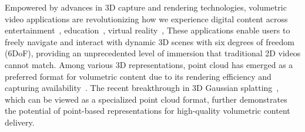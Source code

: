 

Empowered by advances in 3D capture and rendering technologies, volumetric video applications are revolutionizing how we experience digital content across entertainment~\cite{volumetricgames}, education~\cite{emad2022moesr}, virtual reality~\cite{efeve2024}, \etc These applications enable users to freely navigate and interact with dynamic 3D scenes with six degrees of freedom (6DoF), providing an unprecedented level of immersion that traditional 2D videos cannot match. Among various 3D representations, point cloud has emerged as a preferred format for volumetric content due to its rendering efficiency and capturing availability~\cite{yangComparativeMeasurementStudy2023,zhang_yuzu_nodate}. The recent breakthrough in 3D Gaussian splatting~\cite{luitenDynamic3DGaussians2023a}, which can be viewed as a specialized point cloud format, further demonstrates the potential of point-based representations for high-quality volumetric content delivery.

